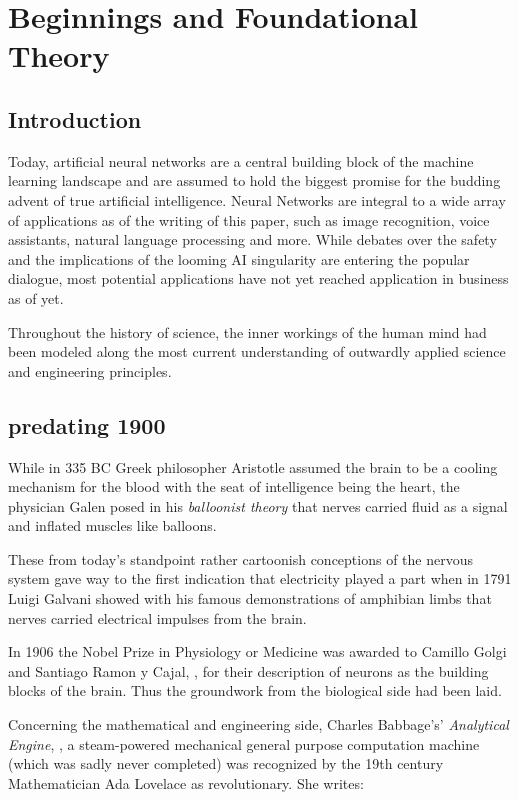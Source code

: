 \chapter{Beginnings and Foundational Theory}

\section{Introduction}

Today, artificial neural networks are a central building block of the machine learning landscape and are assumed to hold the biggest promise for the budding advent of true artificial intelligence. Neural Networks are integral to a wide array of applications as of the writing of this paper, such as image recognition, voice assistants, natural language processing and more. While debates over the safety and the implications of the looming \ac{AI} singularity are entering the popular dialogue, most potential applications have not yet reached application in business as of yet.



Throughout the history of science, the inner workings of the human mind had been modeled along the most current understanding of outwardly applied science and engineering principles.

\section{predating 1900}

While in 335 BC Greek philosopher Aristotle assumed the brain to be a cooling mechanism for the blood with the seat of intelligence being the heart, the physician Galen posed in his \textit{balloonist theory} that nerves carried fluid as a signal and inflated muscles like balloons.

These from today's standpoint rather cartoonish conceptions of the nervous system gave way to the first indication that electricity played a part when in 1791 Luigi Galvani showed with his famous demonstrations of amphibian limbs that nerves carried electrical impulses from the brain. 

In 1906 the Nobel Prize in Physiology or Medicine was awarded to Camillo Golgi and Santiago Ramon y Cajal, \cite{golgi}, for their description of neurons as the building blocks of the brain. Thus the groundwork from the biological side had been laid.

Concerning the mathematical and engineering side, Charles Babbage's' \textit{Analytical Engine}, \cite{babbage}, a steam-powered mechanical general purpose computation machine (which was sadly never completed) was recognized by the 19th century Mathematician Ada Lovelace as revolutionary. She writes:


